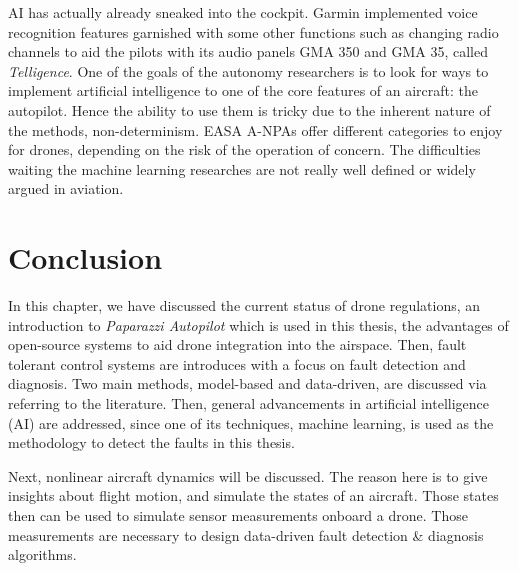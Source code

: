 AI has actually already sneaked into the cockpit. Garmin implemented voice recognition features garnished with some other functions such as changing radio channels to aid the pilots with its audio panels GMA 350 and GMA 35, called \emph{Telligence}. 
One of the goals of the autonomy researchers is to look for ways to implement artificial intelligence to one of the core features of an aircraft: the autopilot. Hence the ability to use them is tricky due to the inherent nature of the methods, non-determinism. EASA A-NPAs offer different categories to enjoy for drones, depending on the risk of the operation of concern. The difficulties waiting the machine learning researches are not really well defined or widely argued in aviation. 


\section{Conclusion}

In this chapter, we have discussed the current status of drone regulations, an introduction to \emph{Paparazzi Autopilot} which is used in this thesis, the advantages of open-source systems to aid drone integration into the airspace. Then, fault tolerant control systems are introduces with a focus on fault detection and diagnosis. Two main methods, model-based and data-driven, are discussed via referring to the literature. Then, general advancements in artificial intelligence (AI) are addressed, since one of its techniques, machine learning, is used as the methodology to detect the faults in this thesis. 

Next, nonlinear aircraft dynamics will be discussed. The reason here is to give insights about flight motion, and simulate the states of an aircraft. Those states then can be used to simulate sensor measurements onboard a drone. Those measurements are necessary to design data-driven fault detection \& diagnosis algorithms.
